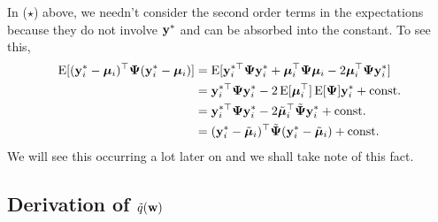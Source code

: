 \begin{remark}
  In ($\star$)  above,  we needn't consider the second order terms in the expectations because they do not involve ${\mathbf y}^*$ and can be absorbed into the constant.
  To see this,
  \begin{align*}
    \operatorname{E}[({\mathbf y}^*_i - {\bm\mu}_i)^\top{\bm\Psi}({\mathbf y}^*_i - {\bm\mu}_i)]
    &= \operatorname{E}[{\mathbf y}^{*\top}_i{\bm\Psi} {\mathbf y}^*_i + {\bm\mu}_i^\top{\bm\Psi}{\bm\mu}_i - 2{\bm\mu}_i^\top{\bm\Psi}{\mathbf y}^*_i] \\
    &= {\mathbf y}^{*\top}_i{\bm\Psi} {\mathbf y}^*_i - 2 \operatorname{E}[{\bm\mu}_i^\top] \operatorname{E}[{\bm\Psi}]{\mathbf y}^*_i + \text{const.}\hspace{0.01em} \\
    &= {\mathbf y}^{*\top}_i{\bm\Psi} {\mathbf y}^*_i - 2 \tilde{{\bm\mu}}_i^\top\tilde{{\bm\Psi}}{\mathbf y}^*_i + \text{const.}\hspace{0.01em} \\
    &= ({\mathbf y}^*_i - \tilde{{\bm\mu}}_i)^\top \tilde{{\bm\Psi}} ({\mathbf y}^*_i - \tilde{{\bm\mu}}_i) + \text{const.}\hspace{0.01em}
  \end{align*}
  We will see this occurring a lot later on and we shall take note of this fact.
\end{remark}


\subsection{Derivation of \texorpdfstring{$\tilde q({\mathbf w})$}{$\tilde q(w)$}}

